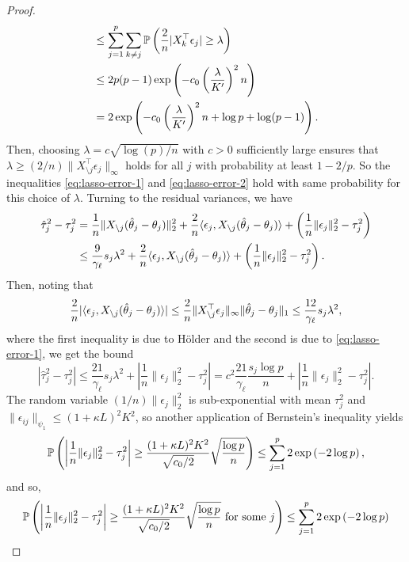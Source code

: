 \documentclass{article}
\begin{document}
\begin{proof}
\[\begin{aligned}
        &\leq \sum_{j=1}^{p} \sum_{k\neq j} {\mathbb{P}}\left(\frac{2}{n}|X_k^\top \epsilon_j| \geq \lambda\right) \\
        &\leq 2p(p-1) \exp\left(-c_0\left(\frac{\lambda}{K'}\right)^2 n \right) \\
        &= 2 \exp\left(-c_0\left(\frac{\lambda}{K'}\right)^2 n + \log p + \log(p-1)\right).
    \end{aligned}
\]
Then, choosing $\lambda = c\sqrt{\log(p) /n}$ with $c>0$ sufficiently large
ensures that $\lambda \geq (2/n)\|X_{\setminus j}^\top \epsilon_j\|_\infty$
holds for all $j$ with probability at least $1 - 2/p$. So the inequalities
\eqref{eq:lasso-error-1} and \eqref{eq:lasso-error-2} hold with same probability
for this choice of $\lambda$. Turning to the residual variances, we have
\[
    \begin{aligned}
        \hat \tau_j^2 - \tau_j^2 &= \frac{1}{n} \|X_{\setminus j}(\hat \theta_j - \theta_j)\|_2^2 + \frac{2}{n}\langle \epsilon_j, X_{\setminus j}(\hat \theta_j - \theta_j) \rangle + \left(\frac{1}{n}\|\epsilon_j\|_2^2 - \tau_j^2\right) \\
        &\leq \frac{9}{\gamma_\ell} s_j \lambda^2 + \frac{2}{n}\langle \epsilon_j, X_{\setminus j}(\hat \theta_j - \theta_j) \rangle + \left(\frac{1}{n}\|\epsilon_j\|_2^2 - \tau_j^2\right). 
    \end{aligned}
\]
Then, noting that 
\[
    \frac{2}{n} |\langle \epsilon_j, X_{\setminus j}(\hat \theta_j - \theta_j) \rangle| \leq \frac{2}{n}\|X_{\setminus j}^\top \epsilon_j\|_\infty \|\hat \theta_j - \theta_j\|_1 \leq \frac{12}{\gamma_\ell} s_j \lambda^2, 
\]
where the first inequality is due to Hölder and the second is due to
\eqref{eq:lasso-error-1}, we get the bound
\begin{equation}\label{eq:var-bound}
    |\hat \tau_j^2 - \tau_j^2| \leq \frac{21}{\gamma_\ell} s_j \lambda^2 + \left|\frac{1}{n}\|\epsilon_j\|_2^2 - \tau_j^2\right| = c^2\frac{21}{\gamma_\ell} \frac{s_j \log p}{n} + \left|\frac{1}{n}\|\epsilon_j\|_2^2 - \tau_j^2\right|.    
\end{equation}
The random variable $(1/n)\|\epsilon_j\|_2^2$ is sub-exponential
with mean
$\tau_j^2$ and $\|\epsilon_{ij}\|_{\psi_1} \leq (1 + \kappa L)^2 K^2$, so
another application of Bernstein's inequality yields
\[
    {\mathbb{P}}\left(\left|\frac{1}{n}\|\epsilon_j\|_2^2 - \tau_j^2\right| \geq \frac{(1 + \kappa L)^2 K^2}{\sqrt{c_0 / 2}} \sqrt{\frac{\log p}{n}}\right) \leq \sum_{j=1}^{p} 2\exp\left(- 2 \log p\right),
\]
and so,
\[
    \begin{aligned}
        \prob\left(\left|\frac{1}{n}\|\epsilon_j\|_2^2 - \tau_j^2\right| \geq \frac{(1 + \kappa L)^2 K^2}{\sqrt{c_0 / 2}} \sqrt{\frac{\log p}{n}} \text{ for some } j \right) &\leq \sum_{j=1}^{p} 2\exp\left(- 2 \log p\right) \\

\end{aligned}\]
\end{proof}
\end{document}
